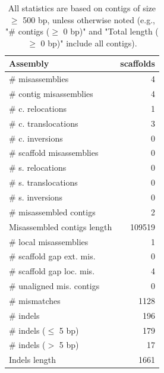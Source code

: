 \documentclass[12pt,a4paper]{article}
\begin{document}
\begin{table}[ht]
\begin{center}
\caption{All statistics are based on contigs of size $\geq$ 500 bp, unless otherwise noted (e.g., "\# contigs ($\geq$ 0 bp)" and "Total length ($\geq$ 0 bp)" include all contigs).}
\begin{tabular}{|l*{1}{|r}|}
\hline
Assembly & scaffolds \\ \hline
\# misassemblies & 4 \\ \hline
\hspace{2mm}\# contig misassemblies & 4 \\ \hline
\hspace{5mm}\# c. relocations & 1 \\ \hline
\hspace{5mm}\# c. translocations & 3 \\ \hline
\hspace{5mm}\# c. inversions & 0 \\ \hline
\hspace{2mm}\# scaffold misassemblies & 0 \\ \hline
\hspace{5mm}\# s. relocations & 0 \\ \hline
\hspace{5mm}\# s. translocations & 0 \\ \hline
\hspace{5mm}\# s. inversions & 0 \\ \hline
\# misassembled contigs & 2 \\ \hline
Misassembled contigs length & 109519 \\ \hline
\# local misassemblies & 1 \\ \hline
\# scaffold gap ext. mis. & 0 \\ \hline
\# scaffold gap loc. mis. & 4 \\ \hline
\# unaligned mis. contigs & 0 \\ \hline
\# mismatches & 1128 \\ \hline
\# indels & 196 \\ \hline
\hspace{5mm}\# indels ($\leq$ 5 bp) & 179 \\ \hline
\hspace{5mm}\# indels ($>$ 5 bp) & 17 \\ \hline
Indels length & 1661 \\ \hline
\end{tabular}
\end{center}
\end{table}
\end{document}
